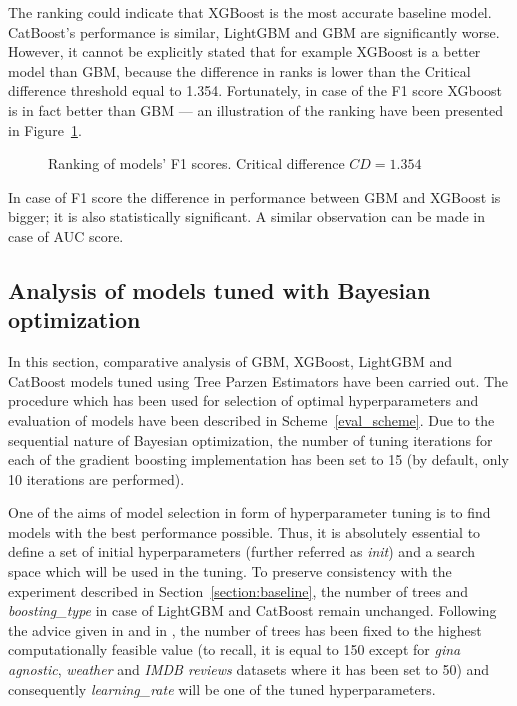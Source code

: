 \documentclass[magisterska, english]{pwr_wmat_praca_dyplomowa}
\theoremstyle{plain}
\numberwithin{theorem}{chapter}
\theoremstyle{definition}
\numberwithin{theorem}{chapter}
\newcommand{\gbm}{GBM, XGBoost, LightGBM and CatBoost }
\begin{document}
The ranking could indicate that XGBoost is the most accurate baseline model. CatBoost's performance is similar, LightGBM and GBM are significantly worse. However, it cannot be explicitly stated that for example XGBoost is a better model than GBM, because the difference in ranks is lower than the Critical difference threshold equal to 1.354. Fortunately, in case of the F1 score XGboost is in fact better than GBM --- an illustration of the ranking have been presented in Figure~\ref{fig:no_tuning_F1_heatmap}.

\begin{figure}[H]
	\centering
	\caption{Ranking of models' F1 scores. Critical difference $CD = 1.354$}
	\label{fig:no_tuning_F1_heatmap}
\end{figure}

In case of F1 score the difference in performance between GBM and XGBoost is bigger; it is also statistically significant. A similar observation can be made in case of AUC score. 

\subsection{Analysis of models tuned with Bayesian optimization}\label{section_tpe}
In this section, comparative analysis of \gbm models tuned using Tree Parzen Estimators have been carried out. The procedure which has been used for selection of optimal hyperparameters and evaluation of models have been described in Scheme~\ref{eval_scheme}. Due to the sequential nature of Bayesian optimization, the number of tuning iterations for each of the gradient boosting implementation has been set to 15 (by default, only 10 iterations are performed). 

One of the aims of model selection in form of hyperparameter tuning is to find models with the best performance possible. Thus, it is absolutely essential to define a set of initial hyperparameters (further referred as \emph{init}) and a search space which will be used in the tuning. To preserve consistency with the experiment described in Section~\ref{section:baseline}, the number of trees and \emph{boosting\_type} in case of LightGBM and CatBoost remain unchanged. Following the advice given in \cite{comparative_analysis} and in \cite{friedman_gbm}, the number of trees has been fixed to the highest computationally feasible value (to recall, it is equal to 150 except for \emph{gina agnostic}, \emph{weather} and \emph{IMDB reviews} datasets where it has been set to 50) and consequently \emph{learning\_rate} will be one of the tuned hyperparameters.
\end{document}
